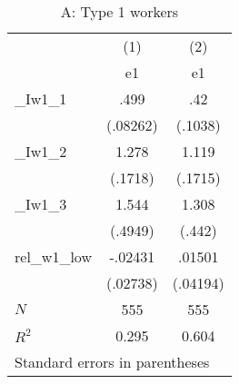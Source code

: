 \begin{table}[htbp]\centering
\caption{A: Type 1 workers}
\begin{tabular}{l*{2}{c}}
\hline\hline
            &\multicolumn{1}{c}{(1)}&\multicolumn{1}{c}{(2)}\\
            &\multicolumn{1}{c}{e1}&\multicolumn{1}{c}{e1}\\
\hline
\_Iw1\_1      &        .499&         .42\\
            &    (.08262)&     (.1038)\\
[1em]
\_Iw1\_2      &       1.278&       1.119\\
            &     (.1718)&     (.1715)\\
[1em]
\_Iw1\_3      &       1.544&       1.308\\
            &     (.4949)&      (.442)\\
[1em]
rel\_w1\_low  &     -.02431&      .01501\\
            &    (.02738)&    (.04194)\\
\hline
\(N\)       &         555&         555\\
\(R^{2}\)   &       0.295&       0.604\\
\hline\hline
\multicolumn{3}{l}{\footnotesize Standard errors in parentheses}\\
\end{tabular}
\end{table}

